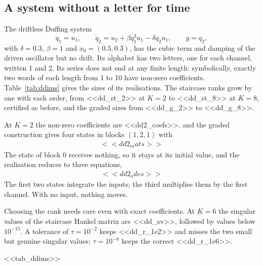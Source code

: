 \documentclass[11pt,a4paper]{article}
\theoremstyle{remark}
\begin{document}
\subsection{A system without a letter for time}\label{sec:dduffing}
The driftless Duffing system
\begin{equation}\label{eq:dduffing}
\dot q_1=u_1,\qquad \dot q_2=u_2+\beta q_1^3u_1-\delta q_2u_1,\qquad y=q_2,
\end{equation}
with $\delta=0.3$, $\beta=1$ and $x_0=(0.5,0.3)$, has the cubic term and damping of the driven oscillator but no drift.
Its alphabet has two letters, one for each channel, written 1 and 2.
Its series does not end at any finite length: symbolically, exactly two words of each length from 1 to 10 have non-zero coefficients.
Table~\ref{tab:ddims} gives the sizes of its realisations.
The staircase ranks grow by one with each order, from <<dd_st_2>> at $K=2$ to <<dd_st_8>> at $K=8$, certified as before, and the graded sizes from <<dd_g_2>> to <<dd_g_8>>.

At $K=2$ the non-zero coefficients are <<dd2_coefs>>, and the graded construction gives four states in blocks $(1,2,1)$ with
\begin{gather*}
<<dd2_mats>>
\end{gather*}
The state of block 0 receives nothing, so it stays at its initial value, and the realisation reduces to three equations,
\begin{gather*}
<<dd2_odes>>
\end{gather*}
The first two states integrate the inputs; the third multiplies them by the first channel.
With no input, nothing moves.

Choosing the rank needs care even with exact coefficients.
At $K=6$ the singular values of the staircase Hankel matrix are <<dd_sv>>, followed by values below $10^{-15}$.
A tolerance of $\tau=10^{-2}$ keeps <<dd_r_1e2>> and misses the two small but genuine singular values; $\tau=10^{-6}$ keeps the correct <<dd_r_1e6>>.

\begin{table}[t]\centering\small
\caption{Sizes of the realisations of the driftless Duffing series truncated at order $K$, with the same columns as Table~\ref{tab:dims}.}\label{tab:ddims}
<<tab_ddims>>
\end{table}
\end{document}
